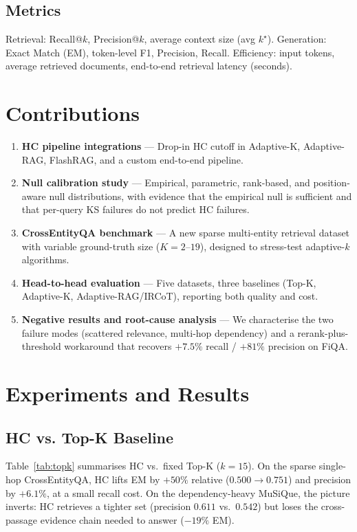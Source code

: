 \documentclass[letterpaper]{article}
\newcommand{\CEqaEMHC}{0.751}
\newcommand{\CEqaEMTopK}{0.500}
\newcommand{\MusPrecHC}{0.611}
\newcommand{\MusPrecTopK}{0.542}
\begin{document}
\subsection{Metrics}
Retrieval: Recall@$k$, Precision@$k$, average context size (avg
$k^\star$). Generation: Exact Match (EM), token-level F1, Precision,
Recall. Efficiency: input tokens, average retrieved documents,
end-to-end retrieval latency (seconds).

\section{Contributions}

\begin{enumerate}
\item \textbf{HC pipeline integrations} --- Drop-in HC cutoff in
Adaptive-K, Adaptive-RAG, FlashRAG, and a custom end-to-end pipeline.
\item \textbf{Null calibration study} --- Empirical, parametric,
rank-based, and position-aware null distributions, with evidence that
the empirical null is sufficient and that per-query KS failures do
not predict HC failures.
\item \textbf{CrossEntityQA benchmark} --- A new sparse multi-entity
retrieval dataset with variable ground-truth size ($K = 2$--$19$),
designed to stress-test adaptive-$k$ algorithms.
\item \textbf{Head-to-head evaluation} --- Five datasets, three
baselines (Top-K, Adaptive-K, Adaptive-RAG/IRCoT), reporting both
quality and cost.
\item \textbf{Negative results and root-cause analysis} --- We
characterise the two failure modes (scattered relevance, multi-hop
dependency) and a rerank-plus-threshold workaround that recovers
$+7.5\%$ recall / $+81\%$ precision on FiQA.
\end{enumerate}

\section{Experiments and Results}

\subsection{HC vs. Top-K Baseline}
\label{sec:topk}
Table~\ref{tab:topk} summarises HC vs.\ fixed Top-K ($k=15$).
On the sparse single-hop CrossEntityQA, HC lifts EM by
$+50\%$ relative ($\CEqaEMTopK \rightarrow \CEqaEMHC$) and precision
by $+6.1\%$, at a small recall cost. On the dependency-heavy
MuSiQue, the picture inverts: HC retrieves a tighter set
(precision $\MusPrecHC$ vs.\ $\MusPrecTopK$) but loses the
cross-passage evidence chain needed to answer ($-19\%$ EM).
\end{document}
